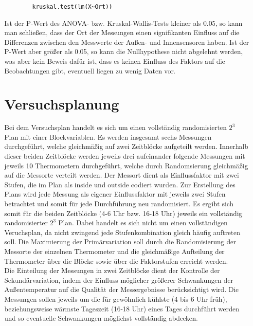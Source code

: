\documentclass[ ngerman, fontsize= 12pt, paper=a4, headings=big, titlepage=true]{article}
\begin{document}
	\begin{lstlisting}
		kruskal.test(lm(X~Ort))
	\end{lstlisting}

	Ist der P-Wert des ANOVA- bzw. Kruskal-Wallis-Tests kleiner als 0.05, so kann man schließen, dass der Ort der Messungen einen signifikanten Einfluss auf die Differenzen zwischen den Messwerte der Außen- und Innensensoren haben. Ist der P-Wert aber größer als 0.05, so kann die Nullhypothese nicht abgelehnt werden, was aber kein Beweis dafür ist, dass es keinen Einfluss des Faktors auf die Beobachtungen gibt, eventuell liegen zu wenig Daten vor.
	
	\section{Versuchsplanung}
	Bei dem Versuchsplan handelt es sich um einen vollständig randomisierten $2^3$ Plan mit einer Blockvariablen. Es werden insgesamt sechs Messungen durchgeführt, welche gleichmäßig auf zwei Zeitblöcke aufgeteilt werden. Innerhalb dieser beiden Zeitblöcke werden jeweils drei aufeinander folgende Messungen mit jeweils 10 Thermometern durchgeführt, welche durch Randomsierung gleichmäßig auf die Messorte verteilt werden. Der Messort dient als Einflussfaktor mit zwei Stufen, die im Plan als inside und outside codiert wurden. Zur Erstellung des Plans wird jede Messung als eigener Einflussfaktor mit jeweils zwei Stufen betrachtet und somit für jede Durchführung neu randomisiert. Es ergibt sich somit für die beiden Zeitblöcke (4-6 Uhr bzw. 16-18 Uhr) jeweils ein vollständig randomisierter $2^3$ Plan. Dabei handelt es sich nicht um einen vollständigen Veruchsplan, da nicht zwingend jede Stufenkombination gleich häufig auftreten soll. Die Maximierung der Primärvariation soll durch die Randomisierung der Messorte der einzelnen Thermometer und die gleichmäßige Aufteilung der Thermometer über die Blöcke sowie über die Faktorstufen erreicht werden. \\

\noindent Die Einteilung der Messungen in zwei Zeitblöcke dient der Kontrolle der Sekundärvariation, indem der Einfluss möglicher größerer Schwankungen der Außentemperatur auf die Qualität der Messergebnisse berücksichtigt wird. Die Messungen sollen jeweils um die für gewöhnlich kühlste (4 bis 6 Uhr früh), beziehungsweise wärmste Tageszeit (16-18 Uhr) eines Tages durchführt werden und so eventuelle Schwankungen möglichst vollständig abdecken.\\
\end{document}
